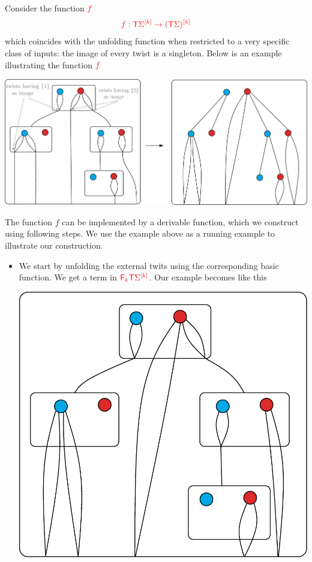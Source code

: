\noindent\begin{example} Consider the function ${\color{red}{f}}$ 
 \begin{align*}
{\color{red}{f : {\color{red}{\mathsf T}}\Sigma^{[k]} \rightarrow  ({\color{red}{\mathsf T}}\Sigma)^{[k]}}}
\end{align*}
which coincides with the unfolding function when restricted to a very specific class of inputs: the image of every twist is a singleton. Below is an example illustrating the function ${\color{red}{f}}$ 
  \begin{center}
\includegraphics[scale=.3]{one-unfold.pdf}
 \end{center}
The function $f$ can be implemented by a derivable function, which we construct using following steps. We use the example above as a running example to illustrate our construction.
\begin{itemize}
 \item We start by unfolding the external twits using the corresponding basic function. We get a term in ${\color{red}{{\color{red}{\mathsf F_{k}}}{\color{red}{\mathsf T}}\Sigma^{[k]}}}$. Our example becomes like this
   \begin{center}
\includegraphics[scale=.3]{one-unfold1.pdf}

\end{center}
\end{itemize}
\end{example}
